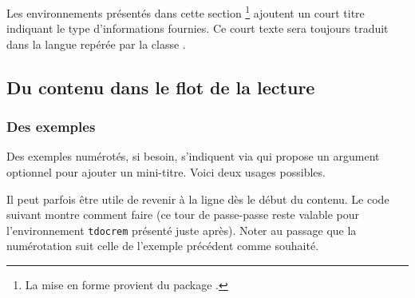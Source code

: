\begin{tdocnote}
    Les environnements présentés dans cette section
    \footnote{
        La mise en forme provient du package .
    }
    ajoutent un court titre indiquant le type d'informations fournies.
    Ce court texte sera toujours traduit dans la langue repérée par la classe \thisproj.
\end{tdocnote}



\subsection{Du contenu dans le flot de la lecture}




\subsubsection{Des exemples}

Des exemples numérotés, si besoin, s'indiquent via  qui propose un argument optionnel pour ajouter un mini-titre.
Voici deux usages possibles.




\begin{tdoctip}
    Il peut parfois être utile de revenir à la ligne dès le début du contenu. Le code suivant montre comment faire (ce tour de passe-passe reste valable pour l'environnement \verb#tdocrem# présenté juste après). Noter au passage que la numérotation suit celle de l'exemple précédent comme souhaité.
\end{tdoctip}





